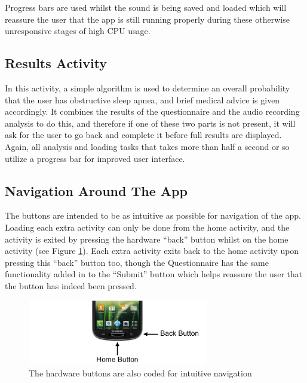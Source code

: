 Progress bars are used whilst the sound is being saved and loaded which will reassure the user that the app is still running properly during these otherwise unresponsive stages of high CPU usage. 
\subsection{Results Activity}
In this activity, a simple algorithm is used to determine an overall probability that the user has obstructive sleep apnea, and brief medical advice is given accordingly. It combines the results of the questionnaire and the audio recording analysis to do this, and therefore if one of these two parts is not present, it will ask for the user to go back and complete it before full results are displayed. Again, all analysis and loading tasks that takes more than half a second or so utilize a progress bar for improved user interface.
\subsection{Navigation Around The App}
The buttons are intended to be as intuitive as possible for navigation of the app. Loading each extra activity can only be done from the home activity, and the activity is exited by pressing the hardware ``back'' button whilst on the home activity (see Figure \ref{fig:nativeButtons}). Each extra activity exits back to the home activity upon pressing this ``back'' button too, though the Questionnaire has the same functionality added in to the ``Submit'' button which helps reassure the user that the button has indeed been pressed.
\begin{figure}[ht!]
		\centering
			\includegraphics[width=0.7\textwidth]{drawings/android_buttons.png}
		\caption{The hardware buttons are also coded for intuitive navigation}
		\label{fig:nativeButtons}
	\end{figure}
